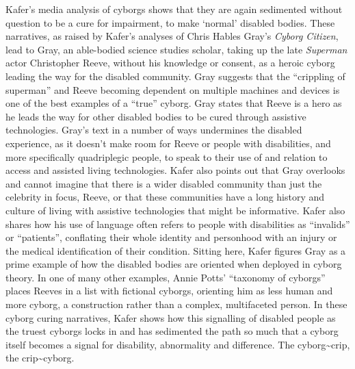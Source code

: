 Kafer's media analysis of cyborgs shows that they are again sedimented
without question to be a cure for impairment, to make `normal' disabled
bodies. These narratives, as raised by Kafer's analyses of Chris Hables
Gray's \emph{Cyborg Citizen}, lead to Gray, an able-bodied science
studies scholar, taking up the late \emph{Superman} actor Christopher
Reeve, without his knowledge or consent, as a heroic cyborg leading the
way for the disabled community. Gray suggests that the ``crippling of
superman'' and Reeve becoming dependent on multiple machines and devices
is one of the best examples of a ``true'' cyborg. Gray states that Reeve
is a hero as he leads the way for other disabled bodies to be cured
through assistive technologies. Gray's text in a number of ways
undermines the disabled experience, as it doesn't make room for Reeve or
people with disabilities, and more specifically quadriplegic people, to
speak to their use of and relation to access and assisted living
technologies. Kafer also points out that Gray overlooks and cannot
imagine that there is a wider disabled community than just the celebrity
in focus, Reeve, or that these communities have a long history and
culture of living with assistive technologies that might be informative.
Kafer also shares how his use of language often refers to people with
disabilities as ``invalids'' or ``patients'', conflating their whole
identity and personhood with an injury or the medical identification of
their condition. Sitting here, Kafer figures Gray as a prime example of
how the disabled bodies are oriented when deployed in cyborg theory. In
one of many other examples, Annie Potts' ``taxonomy of cyborgs'' places
Reeves in a list with fictional cyborgs, orienting him as less human and
more cyborg, a construction rather than a complex, multifaceted person.
In these cyborg curing narratives, Kafer shows how this signalling of
disabled people as the truest cyborgs locks in and has sedimented the
path so much that a cyborg itself becomes a signal for disability,
abnormality and difference. The cyborg\textasciitilde crip, the
crip\textasciitilde cyborg.

